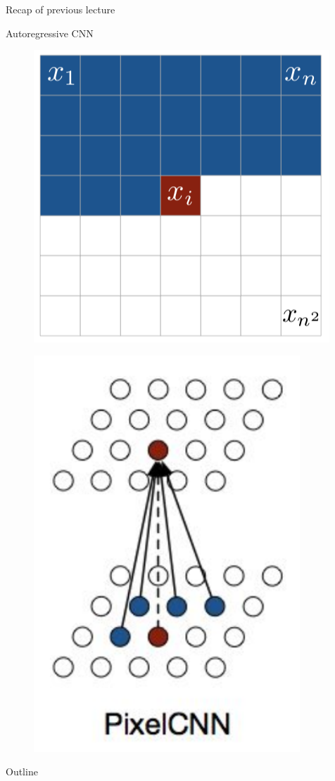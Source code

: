 \begin{frame}{Recap of previous lecture}
	\begin{block}{Autoregressive CNN}
		\begin{minipage}[t]{0.5\columnwidth}
			\begin{figure}
				\centering
	      \includegraphics[width=0.6\linewidth]{figs/pixelcnn1}
			\end{figure}
		\end{minipage}%
		\begin{minipage}[t]{0.5\columnwidth}
			\begin{figure}
				\centering
	      \includegraphics[width=0.45\linewidth]{figs/pixelcnn_0_2}
			\end{figure}
		\end{minipage}
	\end{block}
\end{frame}
\begin{frame}{Outline}
	\tableofcontents
\end{frame}

